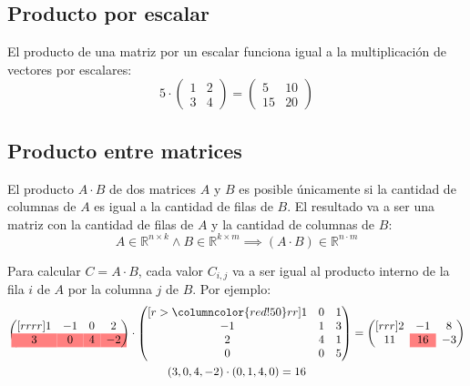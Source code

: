 \documentclass[../teoria.root.tex]{subfiles}
\begin{document}
\subsection{Producto por escalar}

El producto de una matriz por un escalar funciona igual a la multiplicación de
vectores por escalares:
\[5\cdot\begin{pmatrix}
	1 & 2 \\
	3 & 4
\end{pmatrix}=\begin{pmatrix}
	 5 & 10 \\
	15 & 20
\end{pmatrix}\]

\subsection{Producto entre matrices}

El producto $A\cdot B$ de dos matrices $A$ y $B$ es posible únicamente si la
cantidad de columnas de $A$ es igual a la cantidad de filas de $B$. El
resultado va a ser una matriz con la cantidad de filas de $A$ y la cantidad de
columnas de $B$:
\[
	A\in\mathbb{R}^{n\times k}\land
	B\in\mathbb{R}^{k\times m}\implies
	(A\cdot B)\in\mathbb{R}^{n\cdot m}
\]

Para calcular $C=A\cdot B$, cada valor $C_{i,j}$ va a ser igual al producto
interno de la fila $i$ de $A$ por la columna $j$ de $B$. Por ejemplo:
\begin{gather*}
	\begin{pmatrix}[rrrr]
		1 & -1 & 0 &  2 \\
		\rowcolor{red!50} 3 &  0 & 4 & -2
	\end{pmatrix}\cdot
	\begin{pmatrix}[r>{\columncolor{red!50}}rr]
		 1 & 0 & 1 \\
		-1 & 1 & 3 \\
		 2 & 4 & 1 \\
		 0 & 0 & 5
	\end{pmatrix}=
	\begin{pmatrix}[rrr]
		2 & -1 & 8 \\
		11 & \cellcolor{red!50}16 & -3
	\end{pmatrix}\\
	(3,0,4,-2)\cdot(0,1,4,0)=16
\end{gather*}
\end{document}
